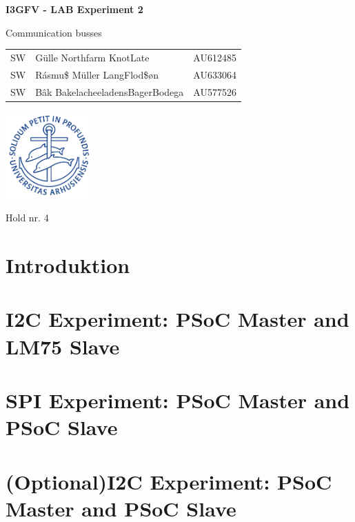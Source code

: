 \documentclass{article}
\begin{document}

\begin{titlepage}
    
  \begin{center}
    \vspace*{1cm}

    \Huge
    \textbf{I3GFV - LAB Experiment 2}

    \vspace{0.5cm}
    \huge
    Communication busses \\
    \date\today

    \vspace{3cm}

    \Large
    \begin{tabular}{l|l|r}
      SW & Gülle Northfarm KnotLate & AU612485 \\
      SW & Rásmu\$ Müller LangFlod\$øn & AU633064\\
      SW & Bâk BakelacheeladensBagerBodega & AU577526 \\
    \end{tabular}
    \vfill
    \includegraphics[width=0.25\textwidth]{au2}
    \vspace{2cm}

      Hold nr. 4

  \end{center}
\end{titlepage}

\newpage

\tableofcontents

\newpage

\setcounter{page}{1}


\section{Introduktion}

\section{I2C Experiment: PSoC Master and LM75 Slave}



\section{SPI Experiment: PSoC Master and PSoC Slave}



\section{(Optional)I2C Experiment: PSoC Master and PSoC Slave }
\end{document}
